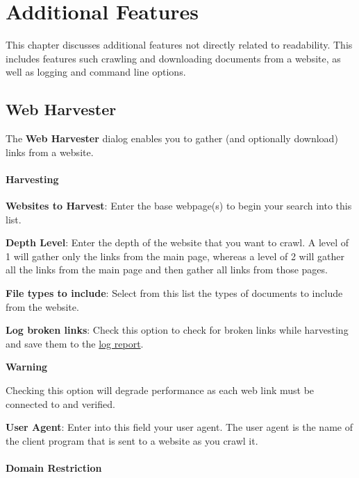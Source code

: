 \documentclass[
]{book}
\newenvironment{warningsection}
    {
    \begin{tcolorbox}[colframe=lightgray,colback=lightpink,arc=3mm]
    \faLightbulb[regular] \textbf{{Warning} } \newline
    }
    {
    \end{tcolorbox}
    }
\theoremstyle{definition}
\theoremstyle{definition}
\theoremstyle{definition}
\theoremstyle{definition}
\theoremstyle{remark}
\begin{document}
\hypertarget{additional-features}{%
\chapter{Additional Features}\label{additional-features}}

This chapter discusses additional features not directly related to readability. This includes features such crawling and downloading documents from a website, as well as logging and command line options.

\hypertarget{web-harvester}{%
\section{Web Harvester}\label{web-harvester}}

The \textbf{Web Harvester} dialog enables you to gather (and optionally download) links from a website.

\hypertarget{harvesting}{%
\subsubsection*{Harvesting}\label{harvesting}}

\textbf{Websites to Harvest}: Enter the base webpage(s) to begin your search into this list.

\textbf{Depth Level}: Enter the depth of the website that you want to crawl. A level of 1 will gather only the links from the main page, whereas a level of 2 will gather all the links from the main page and then gather all links from those pages.

\textbf{File types to include}: Select from this list the types of documents to include from the website.

\textbf{Log broken links}: Check this option to check for broken links while harvesting and save them to the \protect\hyperlink{log-report}{log report}.

\begin{warningsection}
Checking this option will degrade performance as each web link must be connected to and verified.

\end{warningsection}

\textbf{User Agent}: Enter into this field your user agent. The user agent is the name of the client program that is sent to a website as you crawl it.

\hypertarget{domain-restriction}{%
\subsubsection*{Domain Restriction}\label{domain-restriction}}
\end{document}
